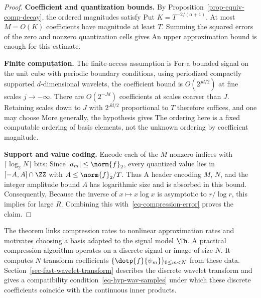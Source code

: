 \begin{proof}
\par\smallskip\noindent\textbf{Coefficient and quantization bounds.}\quad
By Proposition~\ref{prop-equiv-comp-decay}, the ordered magnitudes satisfy
Put $K=T^{-2/(\alpha+1)}$. At most $M=O(K)$ coefficients have magnitude at least $T$. Summing the squared errors of the zero and nonzero quantization cells gives
An upper approximation bound is enough for this estimate.

\par\smallskip\noindent\textbf{Finite computation.}\quad
The finite-access assumption is
For a bounded signal on the unit cube with periodic boundary conditions, using periodized compactly supported $d$-dimensional wavelets, the coefficient bound is $O(2^{jd/2})$ at fine scales $j\to-\infty$. There are $O(2^{-Jd})$ coefficients at scales coarser than $J$. Retaining scales down to $J$ with $2^{Jd/2}$ proportional to $T$ therefore suffices, and one may choose
More generally, the hypothesis gives
The ordering here is a fixed computable ordering of basis elements, not the unknown ordering by coefficient magnitude.

\par\smallskip\noindent\textbf{Support and value coding.}\quad
Encode each of the $M$ nonzero indices with $\lceil\log_2N\rceil$ bits:
Since $|a_m|\leq\norm{f}_2$, every quantized value lies in $[-A,A]\cap\ZZ$ with $A\leq\norm{f}_2/T$. Thus
A header encoding $M$, $N$, and the integer amplitude bound $A$ has logarithmic size and is absorbed in this bound. Consequently,
Because the inverse of $x\mapsto x\log x$ is asymptotic to $r/\log r$, this implies
for large $R$. Combining this with~\eqref{eq-compression-error} proves the claim.
\end{proof}


The theorem links compression rates to nonlinear approximation rates and motivates choosing a basis adapted to the signal model $\Th$.
%
A practical compression algorithm operates on a discrete signal or image of size $N$. It computes $N$ transform coefficients $\{\dotp{f}{\psi_m}\}_{0\leq m<N}$ from these data. Section~\ref{sec-fast-wavelet-transform} describes the discrete wavelet transform and gives a compatibility condition~\eqref{eq-hyp-wav-samples} under which these discrete coefficients coincide with the continuous inner products.


